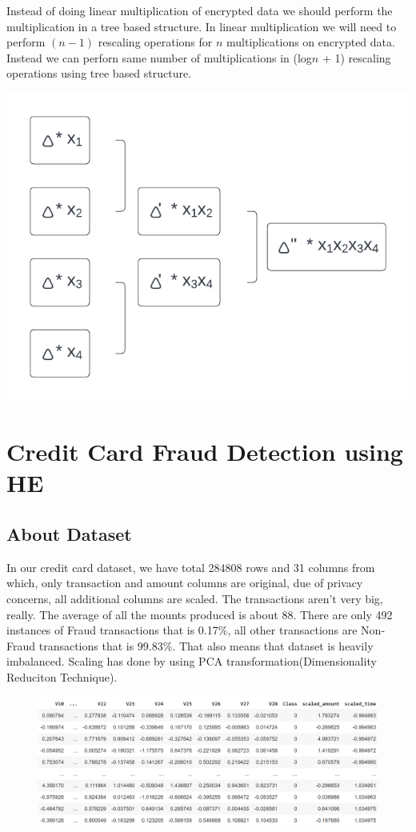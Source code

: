 \documentclass{article}
\begin{document}
\noindent Instead of doing linear multiplication of encrypted data we should perform the multiplication in a tree based structure. In linear multiplication we will need to perform $(n - 1)$ rescaling operations for $n$ multiplications on encrypted data. Instead we can perforn same number of multiplications in (log$n$ + 1) rescaling operations using tree based structure.

\begin{center}
    \includegraphics[width = 3 in]{Blank diagram (1).png}
\end{center}

\section{Credit Card Fraud Detection using HE}

\subsection{About Dataset}

In our credit card dataset, we have total 284808 rows and 31 columns from which, only transaction and amount columns are original, due of privacy concerns, all additional columns are scaled. The transactions aren't very big, really. The average of all the mounts produced is about 88. There are only 492 instances of Fraud transactions that is 0.17\%, all other transactions are Non-Fraud transactions that is 99.83\%. That also means that dataset is heavily imbalanced. Scaling has done by using PCA transformation(Dimensionality Reduciton Technique).

\begin{figure}[!h]
\centering
\includegraphics[width = 4 in]{img1.png}~
\end{figure}
\end{document}
